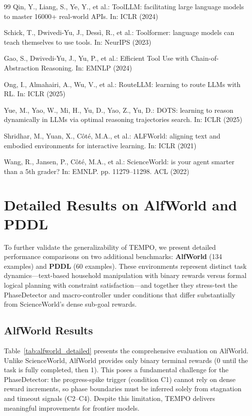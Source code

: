 \documentclass[runningheads]{llncs}
\begin{document}
\begin{thebibliography}{99}
Qin, Y., Liang, S., Ye, Y., et al.: ToolLLM: facilitating large language models to master 16000+ real-world APIs. In: ICLR (2024)

Schick, T., Dwivedi-Yu, J., Dessì, R., et al.: Toolformer: language models can teach themselves to use tools. In: NeurIPS (2023)

Gao, S., Dwivedi-Yu, J., Yu, P., et al.: Efficient Tool Use with Chain-of-Abstraction Reasoning. In: EMNLP (2024)

Ong, I., Almahairi, A., Wu, V., et al.: RouteLLM: learning to route LLMs with RL. In: ICLR (2025)

Yue, M., Yao, W., Mi, H., Yu, D., Yao, Z., Yu, D.: DOTS: learning to reason dynamically in LLMs via optimal reasoning trajectories search. In: ICLR (2025)

Shridhar, M., Yuan, X., Côté, M.A., et al.: ALFWorld: aligning text and embodied environments for interactive learning. In: ICLR (2021)

Wang, R., Jansen, P., Côté, M.A., et al.: ScienceWorld: is your agent smarter than a 5th grader? In: EMNLP. pp. 11279--11298. ACL (2022)

\end{thebibliography}    

\clearpage
\appendix
\section{Detailed Results on AlfWorld and PDDL}
\label{appendix:details}

To further validate the generalizability of TEMPO, we present detailed performance comparisons on two additional benchmarks: \textbf{AlfWorld} (134 examples) and \textbf{PDDL} (60 examples). These environments represent distinct task dynamics—text-based household manipulation with binary rewards versus formal logical planning with constraint satisfaction—and together they stress-test the PhaseDetector and macro-controller under conditions that differ substantially from ScienceWorld's dense sub-goal rewards.

\subsection{AlfWorld Results}
Table~\ref{tab:alfworld_detailed} presents the comprehensive evaluation on AlfWorld. Unlike ScienceWorld, AlfWorld provides only binary terminal rewards (0 until the task is fully completed, then 1). This poses a fundamental challenge for the PhaseDetector: the progress-spike trigger (condition C1) cannot rely on dense reward increments, so phase boundaries must be inferred solely from stagnation and timeout signals (C2--C4). Despite this limitation, TEMPO delivers meaningful improvements for frontier models.
\end{document}
